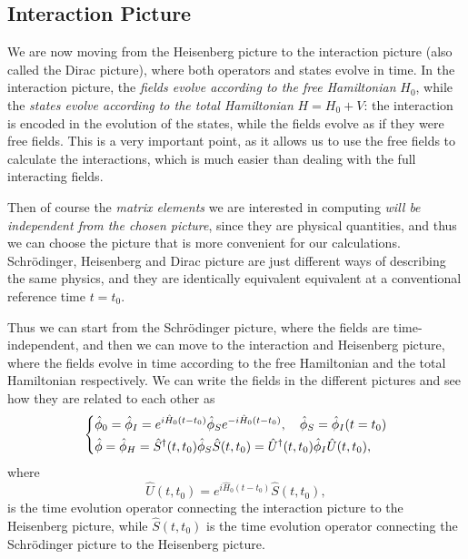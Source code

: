 \subsection{Interaction Picture}

We are now moving from the Heisenberg picture to the interaction picture (also called the Dirac picture), where both operators and states evolve in time. In the interaction picture, the \textit{fields evolve according to the free Hamiltonian} \(H_0\), while the \textit{states evolve according to the total Hamiltonian} \(H = H_0 + V\): the interaction is encoded in the evolution of the states, while the fields evolve as if they were free fields. This is a very important point, as it allows us to use the free fields to calculate the interactions, which is much easier than dealing with the full interacting fields.

Then of course the \textit{matrix elements} we are interested in computing \textit{will be independent from the chosen picture}, since they are physical quantities, and thus we can choose the picture that is more convenient for our calculations. Schrödinger, Heisenberg and Dirac picture are just different ways of describing the same physics, and they are identically equivalent equivalent at a conventional reference time \(t = t_0\).

Thus we can start from the Schrödinger picture, where the fields are time-independent, and then we can move to the interaction and Heisenberg picture, where the fields evolve in time according to the free Hamiltonian and the total Hamiltonian respectively. We can write the fields in the different pictures and see how they are related to each other as
\[
    \begin{dcases}
        \hat{\phi}_0 = \hat{\phi}_I = e^{i \hat{H}_0 (t-t_0)} \hat{\phi}_S e^{-i \hat{H}_0 (t-t_0)}, \quad \hat{\phi}_S = \hat{\phi}_I (t=t_0) \\
        \hat{\phi} = \hat{\phi}_H = \hat{S}^{\dagger}(t,t_0) \hat{\phi}_S \hat{S}(t,t_0) = \hat{U}^{\dagger} (t,t_0) \hat{\phi}_I \hat{U}(t,t_0),
    \end{dcases}
\]
where
\[
    \hat{U}(t,t_0) = e^{i \hat{H}_0 (t-t_0)} \hat{S}(t,t_0),
\]
is the time evolution operator connecting the interaction picture to the Heisenberg picture, while \(\hat{S}(t,t_0)\) is the time evolution operator connecting the Schrödinger picture to the Heisenberg picture.

